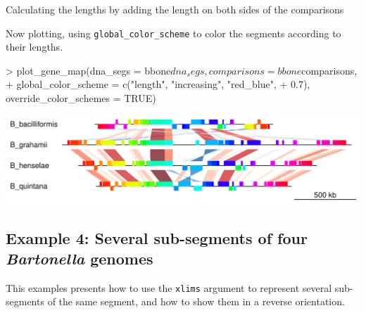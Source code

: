\documentclass[a4paper]{article}
\newcommand{\code}[1]{\texttt{#1}}
\begin{document}
\begin{Schunk}
\end{Schunk}

Calculating the lengths by adding the length on both sides of the comparisons

\begin{Schunk}
\end{Schunk}

Now plotting, using \code{global\_color\_scheme} to color the segments 
according to their lengths.

\begin{Schunk}
\begin{Sinput}
> plot_gene_map(dna_segs = bbone$dna_segs, comparisons = bbone$comparisons, 
+     global_color_scheme = c("length", "increasing", "red_blue", 
+         0.7), override_color_schemes = TRUE)
\end{Sinput}
\end{Schunk}
\begin{center}
\includegraphics{genoPlotR-029}
\end{center}

\subsection{Example 4: Several sub-segments of four \emph{Bartonella} genomes}

This examples presents how to use the \code{xlims} argument to represent 
several sub-segments of the same segment, and how to show them in a reverse
orientation.
\end{document}
